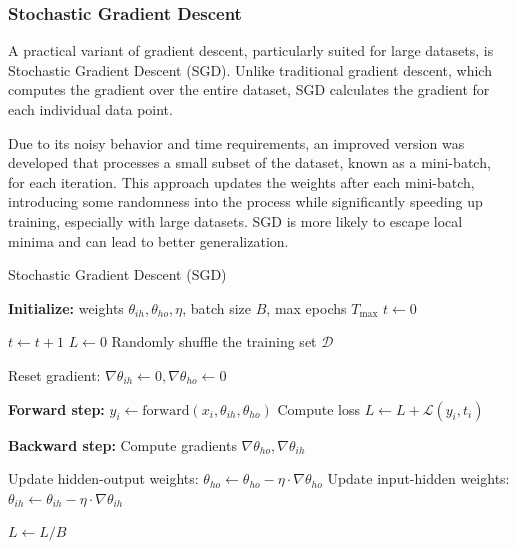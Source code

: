 \subsubsection*{Stochastic Gradient Descent}
A practical variant of gradient descent, particularly suited for large datasets, is Stochastic Gradient Descent (SGD). Unlike traditional gradient descent, which computes the gradient over the entire dataset, SGD calculates the gradient for each individual data point.

Due to its noisy behavior and time requirements, an improved version was developed that processes a small subset of the dataset, known as a mini-batch, for each iteration. This approach updates the weights after each mini-batch, introducing some randomness into the process while significantly speeding up training, especially with large datasets. SGD is more likely to escape local minima and can lead to better generalization.
\begin{algorithm}[H]
\caption{Stochastic Gradient Descent (SGD)}
\begin{algorithmic}[1]
\State \textbf{Initialize:} weights $\theta_{ih}, \theta_{ho}, \eta$, batch size $B$, max epochs $T_{\text{max}}$
\State $t \gets 0$

\Repeat
    \State $t \gets t + 1$
    \State $L \gets 0$ 
    \State Randomly shuffle the training set $\mathcal{D}$

        \State Reset gradient: $\nabla \theta_{ih} \gets 0, \nabla \theta_{ho} \gets 0$
        
            \State \textbf{Forward step:} $y_i \gets \text{forward}(x_i, \theta_{ih}, \theta_{ho})$
            \State Compute loss $L \gets L + \mathcal{L}(y_i, t_i)$
            
            \State \textbf{Backward step:} Compute gradients $\nabla \theta_{ho}, \nabla \theta_{ih}$ 
        \EndFor

        \State Update hidden-output weights: $\theta_{ho} \gets \theta_{ho} - \eta \cdot \nabla \theta_{ho}$
        \State Update input-hidden weights: $\theta_{ih} \gets \theta_{ih} - \eta \cdot \nabla \theta_{ih}$
        
        \State $L \gets L / B$ 
    \EndFor
    

\end{algorithmic}
\end{algorithm}

